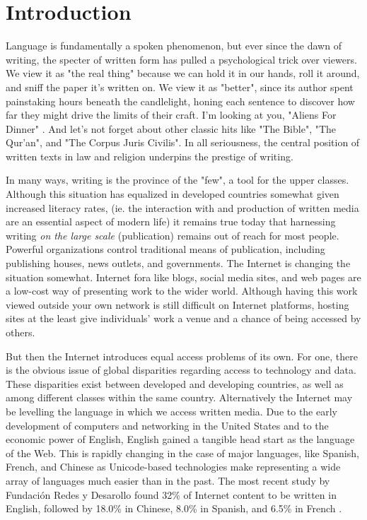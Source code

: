 \section{Introduction}

Language is fundamentally a spoken phenomenon, but ever since the dawn of
writing, the specter of written form has pulled a psychological trick over
viewers. We view it as "the real thing" because we can hold it in our hands,
roll it around, and sniff the paper it's written on. We view it as "better",
since its author spent painstaking hours beneath the candlelight, honing each
sentence to discover how far they might drive the limits of their craft. I'm
looking at you, "Aliens For Dinner" \parencite{spinner94}. And let's not forget
about other classic hits like "The Bible", "The Qur'an", and "The Corpus Juris
Civilis". In all seriousness, the central position of written texts in law and
religion underpins the prestige of writing.

In many ways, writing is the province of the "few", a tool for the upper
classes. Although this situation has equalized in developed countries somewhat
given increased literacy rates, (ie. the interaction with and production of
written media are an essential aspect of modern life) it remains true today that
harnessing writing \textit{on the large scale} (publication) remains out of
reach for most people. Powerful organizations control traditional means of
publication, including publishing houses, news outlets, and governments.  The
Internet is changing the situation somewhat. Internet fora like blogs, social
media sites, and web pages are a low-cost way of presenting work to the wider
world. Although having this work viewed outside your own network is still
difficult on Internet platforms, hosting sites at the least give individuals'
work a venue and a chance of being accessed by others.

But then the Internet introduces equal access problems of its own. For one,
there is the obvious issue of global disparities regarding access to technology
and data. These disparities exist between developed and developing countries, as
well as among different classes within the same country. Alternatively the
Internet may be levelling the language in which we access written media. Due to
the early development of computers and networking in the United States and to
the economic power of English, English gained a tangible head start as the
language of the Web. This is rapidly changing in the case of major languages,
like Spanish, French, and Chinese as Unicode-based technologies make
representing a wide array of languages much easier than in the past. The most
recent study by Fundación Redes y Desarollo found 32\% of Internet content to be
written in English, followed by 18.0\% in Chinese, 8.0\% in Spanish, and 6.5\%
in French \parencite{funredes17}.

